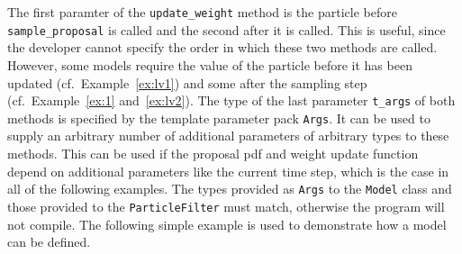 The first paramter of the \texttt{update\_weight} method is the
particle before \texttt{sample\_proposal} is called and the second
after it is called. This is useful, since the developer cannot specify
the order in which these two methods are called. However, some models
require the value of the particle before it has been updated (cf.\
Example~\ref{ex:lv1}) and some after the sampling step (cf.\
Example~\ref{ex:1} and~\ref{ex:lv2}). The type of the last parameter
\texttt{t\_args} of both methods is specified by the template
parameter pack \texttt{Args}. It can be used to supply an arbitrary
number of additional parameters of arbitrary types to these methods.
This can be used if the proposal pdf and weight update function depend
on additional parameters like the current time step, which is the case
in all of the following examples. The types provided as \texttt{Args}
to the \texttt{Model} class and those provided to the
\texttt{ParticleFilter} must match, otherwise the program will not
compile. The following simple example is used to demonstrate how a
model can be defined.


